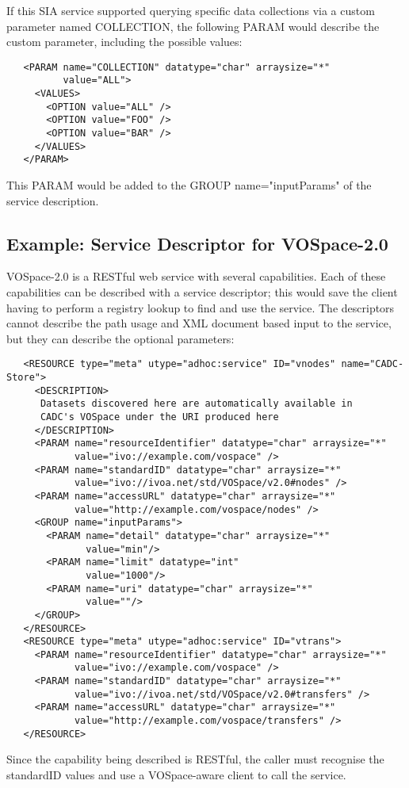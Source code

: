 \documentclass[11pt,a4paper]{ivoa}
\newcommand{\attval}[2]{#1={\allowbreak}{"}#2{"}}
\begin{document}
If this SIA service supported querying specific data collections via
a custom parameter named COLLECTION, the following PARAM would describe the
custom parameter, including the possible values:
\begin{verbatim}
   <PARAM name="COLLECTION" datatype="char" arraysize="*"
          value="ALL">
     <VALUES>
       <OPTION value="ALL" />
       <OPTION value="FOO" />
       <OPTION value="BAR" />
     </VALUES>
   </PARAM>
\end{verbatim}
This PARAM would be added to the GROUP \attval{name}{inputParams}
of the service description.


\subsection{Example: Service Descriptor for VOSpace-2.0}

VOSpace-2.0 is a RESTful web service with several capabilities. Each of
these capabilities can be described with a service descriptor; this would
save the client having to perform a registry lookup to find and use the
service. The descriptors cannot describe the path usage and XML document
based input to the service, but they can describe the optional parameters:
\begin{verbatim}
   <RESOURCE type="meta" utype="adhoc:service" ID="vnodes" name="CADC-Store">
     <DESCRIPTION>
      Datasets discovered here are automatically available in
      CADC's VOSpace under the URI produced here
     </DESCRIPTION>
     <PARAM name="resourceIdentifier" datatype="char" arraysize="*"
            value="ivo://example.com/vospace" />
     <PARAM name="standardID" datatype="char" arraysize="*"
            value="ivo://ivoa.net/std/VOSpace/v2.0#nodes" />
     <PARAM name="accessURL" datatype="char" arraysize="*"
            value="http://example.com/vospace/nodes" />
     <GROUP name="inputParams">
       <PARAM name="detail" datatype="char" arraysize="*"
              value="min"/>
       <PARAM name="limit" datatype="int"
              value="1000"/>
       <PARAM name="uri" datatype="char" arraysize="*"
              value=""/>
     </GROUP>
   </RESOURCE>
   <RESOURCE type="meta" utype="adhoc:service" ID="vtrans">
     <PARAM name="resourceIdentifier" datatype="char" arraysize="*"
            value="ivo://example.com/vospace" />
     <PARAM name="standardID" datatype="char" arraysize="*"
            value="ivo://ivoa.net/std/VOSpace/v2.0#transfers" />
     <PARAM name="accessURL" datatype="char" arraysize="*"
            value="http://example.com/vospace/transfers" />
   </RESOURCE>
\end{verbatim}
Since the capability being described is RESTful, the
caller must recognise the standardID values and use a VOSpace-aware
client to call the service.
\end{document}
